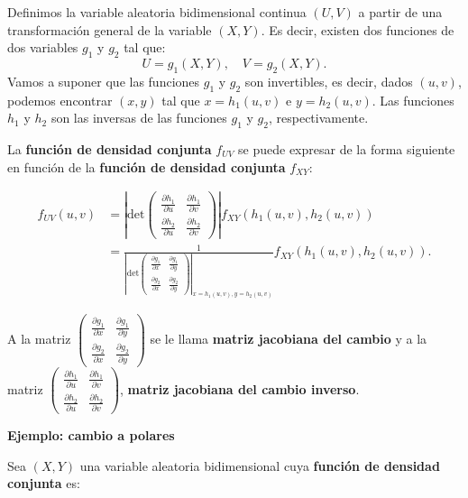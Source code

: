 \documentclass[
  letterpaper,
  DIV=11,
  numbers=noendperiod]{scrreprt}
\begin{document}
Definimos la variable aleatoria bidimensional continua \((U,V)\) a
partir de una transformación general de la variable \((X,Y)\). Es decir,
existen dos funciones de dos variables \(g_1\) y \(g_2\) tal que: \[
U  = g_1 (X,Y),\quad 
V  = g_2 (X,Y).
\] Vamos a suponer que las funciones \(g_1\) y \(g_2\) son invertibles,
es decir, dados \((u,v)\), podemos encontrar \((x,y)\) tal que
\(x=h_1(u,v)\) e \(y=h_2(u,v)\). Las funciones \(h_1\) y \(h_2\) son las
inversas de las funciones \(g_1\) y \(g_2\), respectivamente.

La \textbf{función de densidad conjunta} \(f_{UV}\) se puede expresar de
la forma siguiente en función de la \textbf{función de densidad
conjunta} \(f_{XY}\):

\[
\begin{array}{rl}
f_{UV}(u,v) & =\left|\mathrm{det}\begin{pmatrix}\frac{\partial h_1}{\partial u} & \frac{\partial h_1}{\partial v}\\ \frac{\partial h_2}{\partial u} & \frac{\partial h_2}{\partial v}\end{pmatrix}\right|f_{XY}(h_1(u,v),h_2(u,v))\\ & =\frac{1}{\left|\mathrm{det}\begin{pmatrix}\frac{\partial g_1}{\partial x} & \frac{\partial g_1}{\partial y}\\ \frac{\partial g_2}{\partial x} & \frac{\partial g_2}{\partial y}\end{pmatrix}\right|_{x=h_1(u,v),y=h_2(u,v)}}f_{XY}(h_1(u,v),h_2(u,v)).
\end{array}
\]

A la matriz
\(\begin{pmatrix}\frac{\partial g_1}{\partial x} & \frac{\partial g_1}{\partial y}\\ \frac{\partial g_2}{\partial x} & \frac{\partial g_2}{\partial y}\end{pmatrix}\)
se le llama \textbf{matriz jacobiana del cambio} y a la matriz
\(\begin{pmatrix}\frac{\partial h_1}{\partial u} & \frac{\partial h_1}{\partial v}\\ \frac{\partial h_2}{\partial u} & \frac{\partial h_2}{\partial v}\end{pmatrix}\),
\textbf{matriz jacobiana del cambio inverso}.

\textbf{Ejemplo: cambio a polares}

Sea \((X,Y)\) una variable aleatoria bidimensional cuya \textbf{función
de densidad conjunta} es:
\end{document}
